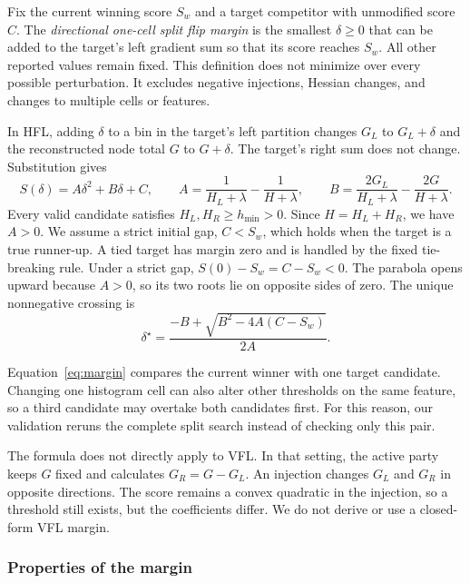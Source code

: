 \documentclass[11pt]{article}
\begin{document}
Fix the current winning score $S_w$ and a target competitor with unmodified score $C$. The \emph{directional one-cell split flip margin} is the smallest $\delta\geq0$ that can be added to the target's left gradient sum so that its score reaches $S_w$. All other reported values remain fixed. This definition does not minimize over every possible perturbation. It excludes negative injections, Hessian changes, and changes to multiple cells or features.

In HFL, adding $\delta$ to a bin in the target's left partition changes $G_L$ to $G_L+\delta$ and the reconstructed node total $G$ to $G+\delta$. The target's right sum does not change. Substitution gives
\begin{equation}
S(\delta)=A\delta^2+B\delta+C,
\qquad
A=\frac{1}{H_L+\lambda}-\frac{1}{H+\lambda},
\qquad
B=\frac{2G_L}{H_L+\lambda}-\frac{2G}{H+\lambda}.
\label{eq:quadratic}
\end{equation}
Every valid candidate satisfies $H_L,H_R\geq h_{\min}>0$. Since $H=H_L+H_R$, we have $A>0$. We assume a strict initial gap, $C<S_w$, which holds when the target is a true runner-up. A tied target has margin zero and is handled by the fixed tie-breaking rule. Under a strict gap, $S(0)-S_w=C-S_w<0$. The parabola opens upward because $A>0$, so its two roots lie on opposite sides of zero. The unique nonnegative crossing is
\begin{equation}
\delta^\star
=\frac{-B+\sqrt{B^2-4A(C-S_w)}}{2A}.
\label{eq:margin}
\end{equation}

Equation~\ref{eq:margin} compares the current winner with one target candidate. Changing one histogram cell can also alter other thresholds on the same feature, so a third candidate may overtake both candidates first. For this reason, our validation reruns the complete split search instead of checking only this pair.

The formula does not directly apply to VFL. In that setting, the active party keeps $G$ fixed and calculates $G_R=G-G_L$. An injection changes $G_L$ and $G_R$ in opposite directions. The score remains a convex quadratic in the injection, so a threshold still exists, but the coefficients differ. We do not derive or use a closed-form VFL margin.

\subsubsection{Properties of the margin}
\end{document}
